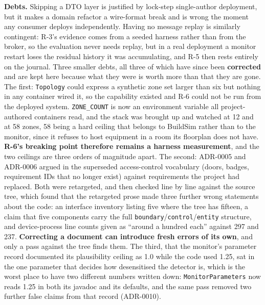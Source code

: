 \textbf{Debts.} Skipping a DTO layer is justified by lock-step single-author deployment, but it makes
a domain refactor a wire-format break and is wrong the moment any consumer deploys independently.
Having no message replay is similarly contingent: R-3's evidence comes from a seeded harness rather
than from the broker, so the evaluation never needs replay, but in a real deployment a monitor
restart loses the residual history it was accumulating, and R-5 then rests entirely on the journal.
Three smaller debts, all three of which have since been \textbf{corrected} and are kept here because
what they were is worth more than that they are gone. The first: \texttt{Topology} could express a
synthetic zone set larger than six but nothing in any container wired it, so the capability existed
and R-6 could not be run from the deployed system. \texttt{ZONE\_COUNT} is now an environment
variable all \factAuthoredServices{} project-authored containers read, and the stack was brought up and watched at 12
and at 58 zones, 58 being a hard ceiling that belongs to BuildSim rather than to the monitor,
since it refuses to host equipment in a room its floorplan does not have. \textbf{R-6's breaking
point therefore remains a harness measurement}, and the two ceilings are three orders of magnitude
apart. The second: ADR-0005 and ADR-0006 argued in the superseded access-control vocabulary (doors,
badges, requirement IDs that no longer exist) against requirements the project had replaced. Both
were retargeted, and then checked line by line against the source tree, which found that the
retargeted prose made three further wrong statements about the code: an interface inventory listing
five where the tree has fifteen, a claim that five components carry the full
\texttt{boundary}/\texttt{control}/\texttt{entity} structure, and device-process line counts given as
``around a hundred each'' against 297 and 237. \textbf{Correcting a document can introduce fresh
errors of its own}, and only a pass against the tree finds them. The third, that the monitor's
parameter record documented its plausibility ceiling as 1.0 while the code used 1.25, sat in the one
parameter that decides how desensitised the detector is, which is the worst place to have two
different numbers written down: \texttt{MonitorParameters} now reads 1.25 in both its javadoc and its
defaults, and the same pass removed two further false claims from that record (ADR-0010).

